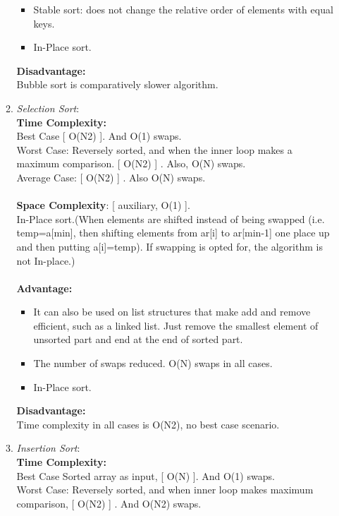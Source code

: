 \documentclass[11pt]{article}
\begin{document}
\begin{enumerate}
\begin{enumerate}
\begin{itemize}
						\item Stable sort: does not change the relative order of elements with equal keys.
						\item In-Place sort.\\
					\end{itemize}
		            \textbf{Disadvantage: }\\
		            Bubble sort is comparatively slower algorithm.
		      \item \textit{Selection Sort}:\\
		            \textbf{Time Complexity: }\\
		            Best Case [ O(N2) ]. And O(1) swaps.\\
		            Worst Case: Reversely sorted, and when the inner loop makes a maximum comparison. [ O(N2) ] . Also, O(N) swaps.\\
		            Average Case: [ O(N2) ] . Also O(N) swaps.\\\\
		            \textbf{Space Complexity}: [ auxiliary, O(1) ]. \\In-Place sort.(When elements are shifted instead of being swapped (i.e. temp=a[min], then shifting elements from ar[i] to ar[min-1] one place up and then putting a[i]=temp).  If swapping is opted for, the algorithm is not In-place.)\\\\
		            \textbf{Advantage: }\\
		            \begin{itemize}
						\item It can also be used on list structures that make add and remove efficient, such as a linked list. Just remove the smallest element of unsorted part and end at the end of sorted part.
						\item The number of swaps reduced. O(N) swaps in all cases.
						\item In-Place sort.
					\end{itemize}
		            \textbf{Disadvantage: }\\
		            Time complexity in all cases is O(N2), no best case scenario.
		      \item \textit{Insertion Sort}: \\
		            \textbf{Time Complexity: }\\
		            Best Case Sorted array as input, [ O(N) ]. And O(1) swaps.\\
		            Worst Case: Reversely sorted, and when inner loop makes maximum comparison, [ O(N2) ] . And O(N2) swaps.\\

\end{enumerate}
\end{enumerate}
\end{document}
